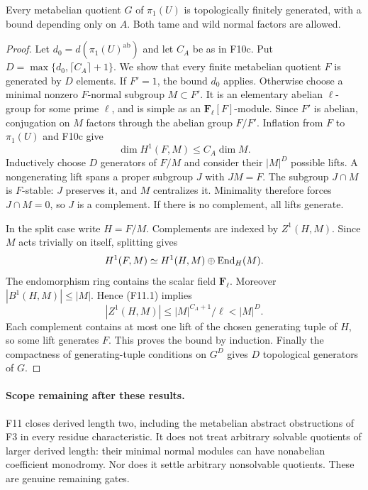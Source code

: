 \begin{theorem}
Every metabelian quotient $G$ of $\pi_1(U)$ is topologically
finitely generated, with a bound depending only on $A$.
Both tame and wild normal factors are allowed.
\end{theorem}
\begin{proof}
Let $d_0=d(\pi_1(U)^{\mathrm{ab}})$ and let $C_A$ be as in
F10c. Put $D=\max\{d_0,\lceil C_A\rceil+1\}$.
We show that every finite metabelian quotient $F$ is generated
by $D$ elements. If $F'=1$, the bound $d_0$ applies. Otherwise
choose a minimal nonzero $F$-normal subgroup $M\subset F'$.
It is an elementary abelian $\ell$-group for some prime $\ell$,
and is simple as an $\mathbf F_\ell[F]$-module. Since $F'$ is
abelian, conjugation on $M$ factors through the abelian group
$F/F'$. Inflation from $F$ to $\pi_1(U)$ and F10c give
\[
                  \dim H^1(F,M)\leq C_A\dim M.
 \tag{F11.1}
\]
Inductively choose $D$ generators of $F/M$ and consider their
$|M|^D$ possible lifts. A nongenerating lift spans a proper
subgroup $J$ with $JM=F$. The subgroup $J\cap M$ is $F$-stable:
$J$ preserves it, and $M$ centralizes it. Minimality therefore
forces $J\cap M=0$, so $J$ is a complement. If there is no
complement, all lifts generate.

In the split case write $H=F/M$. Complements are indexed by
$Z^1(H,M)$. Since $M$ acts trivially on itself, splitting gives
\[
 H^1(F,M)\simeq H^1(H,M)\oplus\operatorname{End}_H(M).
\]
The endomorphism ring contains the scalar field $\mathbf F_\ell$.
Moreover $|B^1(H,M)|\leq|M|$. Hence (F11.1) implies
\[
 |Z^1(H,M)|\leq |M|^{C_A+1}/\ell<|M|^D.
\]
Each complement contains at most one lift of the chosen generating
tuple of $H$, so some lift generates $F$. This proves the bound
by induction. Finally the compactness of generating-tuple conditions
on $G^D$ gives $D$ topological generators of $G$.
\end{proof}

\paragraph{Scope remaining after these results.}
F11 closes derived length two, including the metabelian
abstract obstructions of F3 in every residue characteristic.
It does not treat arbitrary solvable quotients of larger derived
length: their minimal normal modules can have nonabelian
coefficient monodromy. Nor does it settle arbitrary nonsolvable
quotients. These are genuine remaining gates.

